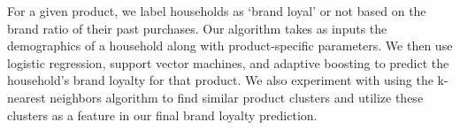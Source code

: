 \documentclass[conference]{IEEEtran}
\begin{document}
For a given product, we label households as `brand loyal' or not based on the brand ratio of their past purchases. Our algorithm takes as inputs the demographics of a household along with product-specific parameters. We then use logistic regression, support vector machines, and adaptive boosting to predict the household's brand loyalty for that product. We also experiment with using the k-nearest neighbors algorithm to find similar product clusters and utilize these clusters as a feature in our final brand loyalty prediction.

%
%



%
%
\end{document}
